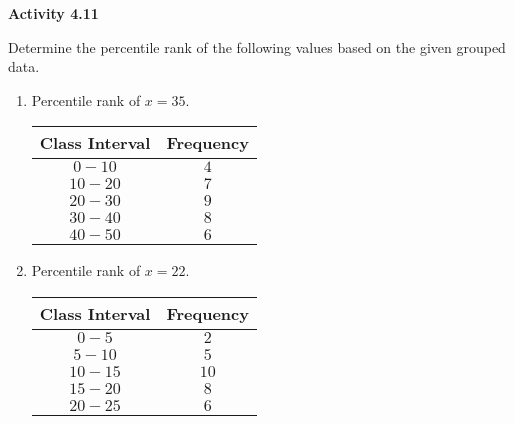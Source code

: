 \vspace{0.3ex}
\noindent\textbf{Activity 4.11}

\vspace{0.2ex}

Determine the percentile rank of the following values based on the given grouped data.  
\begin{multicols}{2}
\begin{enumerate}
\item Percentile rank of \(x = 35\).
  
    \begin{tabular}{|c|c|}
        \hline
        Class Interval & Frequency \\ \hline
        \(0 - 10\) & \(4\) \\ \hline
        \(10 - 20\) & \(7\) \\ \hline
        \(20 - 30\) & \(9\) \\ \hline
        \(30 - 40\) & \(8\) \\ \hline
        \(40 - 50\) & \(6\) \\ \hline
    \end{tabular}
    
  \item Percentile rank of \(x = 22\).
    
    \begin{tabular}{|c|c|}
        \hline
        Class Interval & Frequency \\ \hline
        \(0 - 5\) & \(2\) \\ \hline
        \(5 - 10\) & \(5\) \\ \hline
        \(10 - 15\) & \(10\) \\ \hline
        \(15 - 20\) & \(8\) \\ \hline
        \(20 - 25\) & \(6\) \\ \hline
    \end{tabular}
  \end{enumerate}
  \end{multicols}
